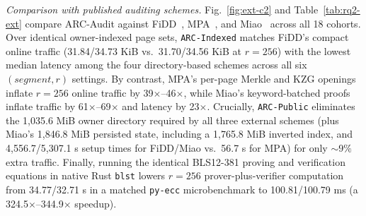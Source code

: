 \documentclass[10pt,journal]{IEEEtran}
\begin{document}
\emph{Comparison with published auditing schemes.}
Fig.~\ref{fig:ext-c2} and Table~\ref{tab:rq2-ext} compare ARC-Audit against FiDD~\cite{Huang2026FiDD}, MPA~\cite{Xu2026MPA}, and Miao~\cite{Miao2025} across all 18 cohorts. Over identical owner-indexed page sets, \texttt{ARC-Indexed} matches FiDD's compact online traffic (31.84/34.73 KiB vs.\ 31.70/34.56 KiB at $r{=}256$) with the lowest median latency among the four directory-based schemes across all six $(segment,r)$ settings. By contrast, MPA's per-page Merkle and KZG openings inflate $r{=}256$ online traffic by 39$\times$--46$\times$, while Miao's keyword-batched proofs inflate traffic by 61$\times$--69$\times$ and latency by 23$\times$. Crucially, \texttt{ARC-Public} eliminates the 1,035.6 MiB owner directory required by all three external schemes (plus Miao's 1,846.8 MiB persisted state, including a 1,765.8 MiB inverted index, and 4,556.7/5,307.1 s setup times for FiDD/Miao vs.\ 56.7 s for MPA) for only $\sim 9\%$ extra traffic. Finally, running the identical BLS12-381 proving and verification equations in native Rust \texttt{blst} lowers $r{=}256$ prover-plus-verifier computation from 34.77/32.71 s in a matched \texttt{py-ecc} microbenchmark to 100.81/100.79 ms (a 324.5$\times$--344.9$\times$ speedup).
\end{document}
